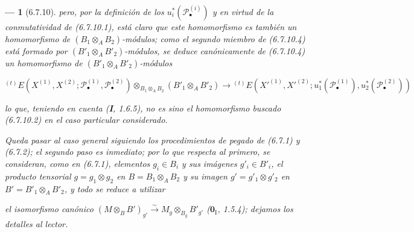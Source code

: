 \documentclass[10pt,oneside,openany]{book}
\theoremstyle{egaenv}\newtheorem*{env}{---}
\theoremstyle{egastatement}
\theoremstyle{egadescription}
\newcommand{\oldpage}[2][]{\marginnote{\normalfont\scriptsize\textbf{#1}\,|\,#2}\ignorespaces}
\begin{document}
\begin{env}[6.7.10]
pero, por la definición de los $u_i^*(\mathscr P_\bullet^{(i)})$ y en virtud
de la conmutatividad de (6.7.10.1), está claro que este homomorfismo es también
un homomorfismo de $(B_1\otimes_A B_2)$-módulos; como el segundo miembro de
(6.7.10.4) está formado por $(B'_1\otimes_A B'_2)$-módulos, se deduce
canónicamente de (6.7.10.4) un homomorfismo de
$(B'_1\otimes_A B'_2)$-módulos

\label{III.6.7.10.5}
\[
  {}^{(t)}E
  (X^{(1)},X^{(2)};\mathscr P_\bullet^{(1)},\mathscr P_\bullet^{(2)})
  \otimes_{B_1\otimes_A B_2}(B'_1\otimes_A B'_2)
  \longrightarrow
  {}^{(t)}E
  (X'^{(1)},X'^{(2)};
   u_1^*(\mathscr P_\bullet^{(1)}),u_2^*(\mathscr P_\bullet^{(2)}))
  \tag{6.7.10.5}\label{III.6.7.10.5.fr}
\]

lo que, teniendo en cuenta (\textbf I, 1.6.5), no es sino el homomorfismo buscado
(6.7.10.2) en el caso particular considerado.

Queda pasar al caso general siguiendo los procedimientos de pegado de (6.7.1)
y (6.7.2); el
segundo paso es inmediato; por lo que respecta al primero, se consideran, como
en (6.7.1), elementos $g_i\in B_i$ y sus imágenes $g'_i\in B'_i$, el producto
tensorial $g=g_1\otimes g_2$ en $B=B_1\otimes_A B_2$ y su imagen
$g'=g'_1\otimes g'_2$ en $B'=B'_1\otimes_A B'_2$, y todo se reduce a utilizar

\oldpage[III]{164}
el isomorfismo canónico
$(M\otimes_B B')_{g'}\xrightarrow{\sim}M_g\otimes_{B_g}B'_{g'}$
($\mathbf{0}_{\mathrm I}$, 1.5.4); dejamos los detalles al lector.
\end{env}
\end{document}
